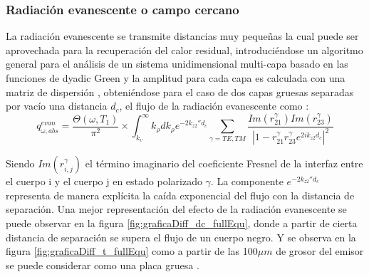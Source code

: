 \subsubsection{Radiación evanescente o campo cercano}
La radiación evanescente se transmite distancias muy pequeñas la cual puede ser aprovechada para la recuperación del calor residual, introduciéndose un algoritmo general para el análisis de un sistema unidimensional multi-capa basado en las funciones de dyadic Green y la amplitud para cada capa es calculada con una matriz de dispersión \cite{nfTPV_fullEquations}, obteniéndose para el caso de dos capas gruesas separadas por vacío una distancia $d_c$, el flujo de la radiación evanescente \cite{nfTPV_equations} como :
\begin{equation}
q_{\omega,abs}^{evan}=\dfrac{\Theta \left( \omega,T_1 \right)}{\pi^2}\times \int^{\infty}_{k_\upsilon}k_\rho d k_\rho e^{-2k_{z2}'' d_c} \sum_{\gamma=TE,TM} \dfrac{Im\left( r_{21}^\gamma \right)Im\left( r_{23}^\gamma \right)}{\left| 1- r_{21}^\gamma r_{23}^\gamma e^{2ik_{z2}d_{c}} \right|^2}
\label{eq:flujoEvasNF}
\end{equation}

Siendo $Im\left(r_{i,j}^\gamma \right)$ el término imaginario del coeficiente Fresnel de la interfaz entre el cuerpo i y el cuerpo j en estado polarizado $\gamma$. La componente $e^{-2k_{z2}'' d_c}$ representa de manera explícita la caída exponencial del flujo con la distancia de separación. Una mejor representación del efecto de la radiación evanescente se puede observar en la figura \ref{fig:graficaDiff_dc_fullEqu}, donde a partir de cierta distancia de separación se supera el flujo de un cuerpo negro. Y se observa en la figura \ref{fig:graficaDiff_t_fullEqu} como a partir de las 100$\mu m$ de grosor del emisor se puede considerar como una placa gruesa \cite{nfTPV_fullEquations}.

